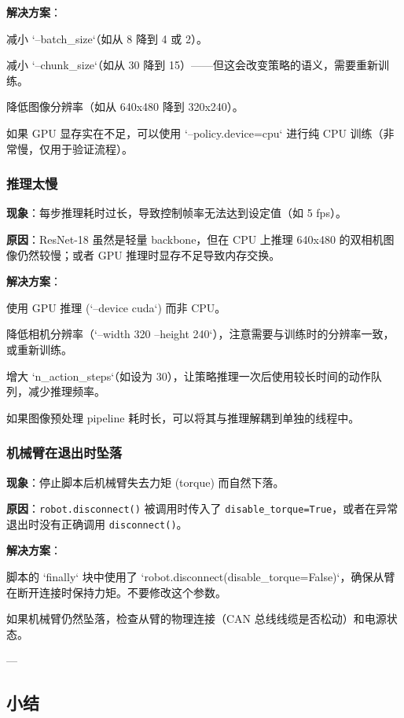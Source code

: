 \documentclass[UTF8,a4paper,11pt]{ctexart}
\begin{document}
{\textbf{解决方案}：
\item[1] 减小 `--batch_size`（如从 8 降到 4 或 2）。
\item[2] 减小 `--chunk_size`（如从 30 降到 15）——但这会改变策略的语义，需要重新训练。
\item[3] 降低图像分辨率（如从 640x480 降到 320x240）。
\item[4] 如果 GPU 显存实在不足，可以使用 `--policy.device=cpu` 进行纯 CPU 训练（非常慢，仅用于验证流程）。

\subsubsection{推理太慢}

\textbf{现象}：每步推理耗时过长，导致控制帧率无法达到设定值（如 5 fps）。

\textbf{原因}：ResNet-18 虽然是轻量 backbone，但在 CPU 上推理 640x480 的双相机图像仍然较慢；或者 GPU 推理时显存不足导致内存交换。

\textbf{解决方案}：
\item[1] 使用 GPU 推理 (`--device cuda`) 而非 CPU。
\item[2] 降低相机分辨率（`--width 320 --height 240`），注意需要与训练时的分辨率一致，或重新训练。
\item[3] 增大 `n_action_steps`（如设为 30），让策略推理一次后使用较长时间的动作队列，减少推理频率。
\item[4] 如果图像预处理 pipeline 耗时长，可以将其与推理解耦到单独的线程中。

\subsubsection{机械臂在退出时坠落}

\textbf{现象}：停止脚本后机械臂失去力矩 (torque) 而自然下落。

\textbf{原因}：\texttt{robot.disconnect()} 被调用时传入了 \texttt{disable_torque=True}，或者在异常退出时没有正确调用 \texttt{disconnect()}。

\textbf{解决方案}：
\item 脚本的 `finally` 块中使用了 `robot.disconnect(disable_torque=False)`，确保从臂在断开连接时保持力矩。不要修改这个参数。
\item 如果机械臂仍然坠落，检查从臂的物理连接（CAN 总线线缆是否松动）和电源状态。

---

\subsection{小结}

}
\end{document}
